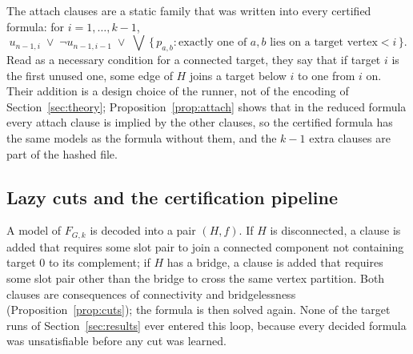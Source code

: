 The attach clauses are a static family that was written into every certified formula: for $i = 1, \dots, k-1$,
\begin{equation}\label{eq:attach}
u_{n-1,i} \;\vee\; \neg u_{n-1,i-1} \;\vee\; \bigvee\,\{\,p_{a,b} : \text{exactly one of } a, b \text{ lies on a target vertex} < i\,\}.
\end{equation}
Read as a necessary condition for a connected target, they say that if target $i$ is the first unused one, some edge of $H$ joins a target below $i$ to one from $i$ on. Their addition is a
design choice of the runner, not of the encoding of Section~\ref{sec:theory}; Proposition~\ref{prop:attach} shows that in the reduced formula every attach clause is
implied by the other clauses, so the certified formula has the same models as the formula without them, and the $k-1$ extra clauses are part of the hashed file.

\subsection{Lazy cuts and the certification pipeline}\label{sec:pipeline}

A model of $F_{G,k}$ is decoded into a pair $(H,f)$. If $H$ is disconnected, a clause is added that requires some slot pair to join a connected component not containing target 0
to its complement; if $H$ has a bridge, a clause is added that requires some slot pair other than the bridge to cross the same vertex partition. Both clauses are consequences of
connectivity and bridgelessness (Proposition~\ref{prop:cuts}); the formula is then solved again. None of the target runs of Section~\ref{sec:results} ever entered this loop, because every
decided formula was unsatisfiable before any cut was learned.

